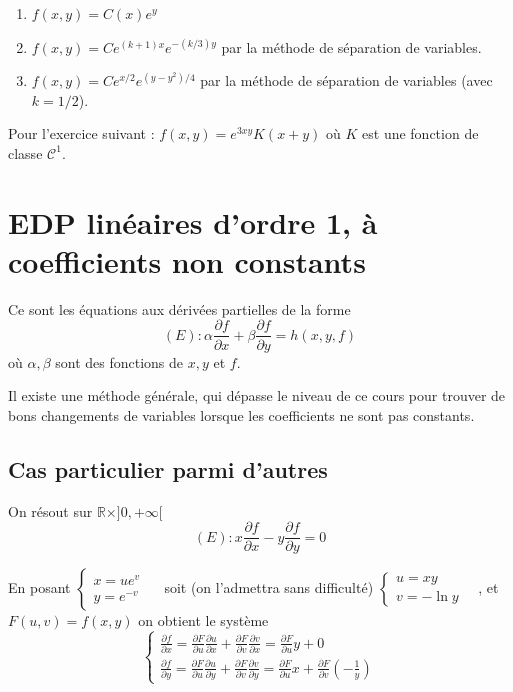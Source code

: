 \documentclass[12pt]{article}
\newcounter{definition}
\newcounter{exercice}
\begin{document}
\begin{corrige}[title=Corrigé des exercices précédents]
\begin{enumerate}
  \item $f(x, y) = C(x) e^{y}$
  
  \item $f(x, y) = C e^{(k+1) x} e^{-(k/3) y}$ par la méthode de séparation de variables.
  
  \item $f(x, y) = C e^{x/2} e^{(y-y^{2})/4}$ par la méthode de séparation de variables (avec $k = 1/2$).
\end{enumerate}

Pour l'exercice suivant : $f(x, y) = e^{3xy} K(x+y)$ où $K$ est une fonction de classe $\mathcal{C}^{1}$.
\end{corrige}

\section{EDP linéaires d'ordre 1, à coefficients non constants}

\begin{definition}
Ce sont les équations aux dérivées partielles de la forme
$$
(E): \alpha \frac{\partial f}{\partial x} + \beta \frac{\partial f}{\partial y} = h(x, y, f)
$$
où $\alpha, \beta$ sont des fonctions de $x, y$ et $f$.
\end{definition}

Il existe une méthode générale, qui dépasse le niveau de ce cours pour trouver de bons changements de variables lorsque les coefficients ne sont pas constants.

\subsection{Cas particulier parmi d'autres}

On résout sur $\mathbb{R} \times ]0, +\infty[$
$$
(E): x \frac{\partial f}{\partial x} - y \frac{\partial f}{\partial y} = 0
$$

En posant $\left\{\begin{array}{l}x = ue^{v} \\ y = e^{-v}\end{array} \quad\right.$ soit (on l'admettra sans difficulté) $\left\{\begin{array}{l}u = xy \\ v = -\ln y\end{array} \quad\right.$, et $F(u, v) = f(x, y)$ on obtient le système
$$
\left\{\begin{array}{l}
\frac{\partial f}{\partial x} = \frac{\partial F}{\partial u} \frac{\partial u}{\partial x} + \frac{\partial F}{\partial v} \frac{\partial v}{\partial x} = \frac{\partial F}{\partial u} y + 0 \\
\frac{\partial f}{\partial y} = \frac{\partial F}{\partial u} \frac{\partial u}{\partial y} + \frac{\partial F}{\partial v} \frac{\partial v}{\partial y} = \frac{\partial F}{\partial u} x + \frac{\partial F}{\partial v}\left(-\frac{1}{y}\right)
\end{array}\right.
$$
\end{document}
